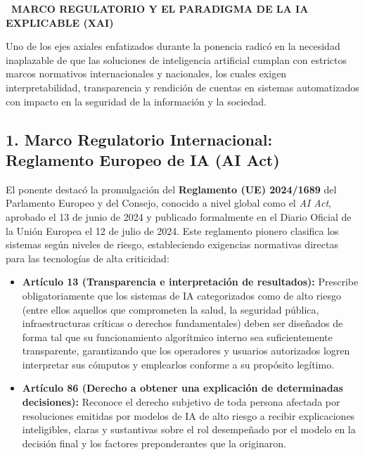\documentclass[12pt,a4paper]{article}
\newcommand{\llav}{\symbol{60}\symbol{60}}
\newcommand{\rlav}{\symbol{62}\symbol{62}}
\newcommand{\marcador}[1]{\llav\ #1\ \rlav}
\newcommand{\seccion}[1]{%
  \vspace{0.65cm}%
  {\centering\bfseries\fontsize{12pt}{14pt}\selectfont\marcador{\MakeUppercase{#1}}\par}%
  \vspace{0.30cm}%
}
\begin{document}
\seccion{MARCO REGULATORIO Y EL PARADIGMA DE LA IA EXPLICABLE (XAI)}

Uno de los ejes axiales enfatizados durante la ponencia radicó en la necesidad inaplazable de que las soluciones de inteligencia artificial cumplan con estrictos marcos normativos internacionales y nacionales, los cuales exigen interpretabilidad, transparencia y rendición de cuentas en sistemas automatizados con impacto en la seguridad de la información y la sociedad.

\subsection*{1. Marco Regulatorio Internacional: Reglamento Europeo de IA (AI Act)}
El ponente destacó la promulgación del \textbf{Reglamento (UE) 2024/1689} del Parlamento Europeo y del Consejo, conocido a nivel global como el \textit{AI Act}, aprobado el 13 de junio de 2024 y publicado formalmente en el Diario Oficial de la Unión Europea el 12 de julio de 2024. Este reglamento pionero clasifica los sistemas según niveles de riesgo, estableciendo exigencias normativas directas para las tecnologías de alta criticidad:
\begin{itemize}
    \item \textbf{Artículo 13 (Transparencia e interpretación de resultados):} Prescribe obligatoriamente que los sistemas de IA categorizados como de alto riesgo (entre ellos aquellos que comprometen la salud, la seguridad pública, infraestructuras críticas o derechos fundamentales) deben ser diseñados de forma tal que su funcionamiento algorítmico interno sea suficientemente transparente, garantizando que los operadores y usuarios autorizados logren interpretar sus cómputos y emplearlos conforme a su propósito legítimo.
    \item \textbf{Artículo 86 (Derecho a obtener una explicación de determinadas decisiones):} Reconoce el derecho subjetivo de toda persona afectada por resoluciones emitidas por modelos de IA de alto riesgo a recibir explicaciones inteligibles, claras y sustantivas sobre el rol desempeñado por el modelo en la decisión final y los factores preponderantes que la originaron.
\end{itemize}
\end{document}

